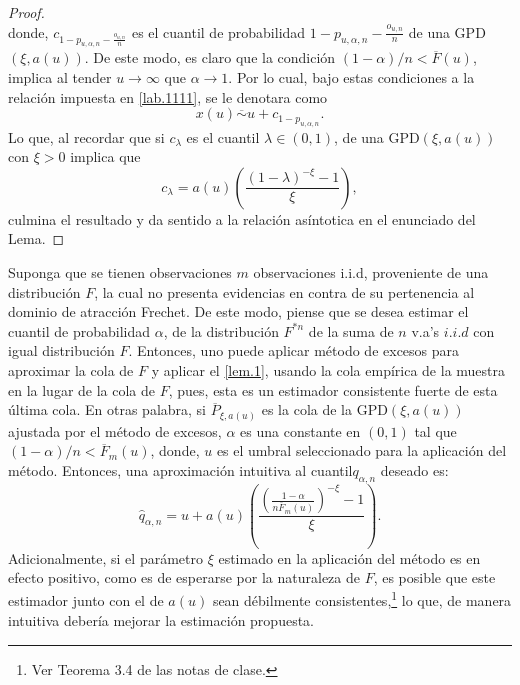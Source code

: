 \documentclass[10.5pt,notitlepage]{article}
\renewcommand{\qedsymbol}{$\blacksquare$}
\newcommand{\pare}[1]{\left( #1 \right)}
\theoremstyle{plain}
\newenvironment{rem}
  {\pushQED{\qed}\renewcommand{\qedsymbol}{$\triangle$}\remarkex}
  {\popQED\endremarkex}
\begin{document}
\begin{proof}
\begin{equation}
\end{equation}
donde, \(c_{1 - p_{u,\alpha,n} - \frac{o_{u,n}}{n}}\) es el cuantil de probabilidad \(1 - p_{u,\alpha,n} - \frac{o_{u,n}}{n}\) de una GPD\((\xi, a(u))\).  
De este modo, es claro que la condición \((1- \alpha)/n < \overline{F}(u)\), implica al tender \(u \to \infty\) que \(\alpha \to 1\). Por lo cual, bajo estas condiciones a la relación impuesta en \eqref{lab.1111}, se le denotara como 
\[
x(u) \overline{\sim} u + c_{1 - p_{u,\alpha,n}}.  
\]
Lo que, al recordar que si \(c_{\lambda}\) es el cuantil \(\lambda \in (0,1)\), de una GPD\((\xi,a(u))\) con \(\xi> 0\) implica que 
\[
c_{\lambda} = a(u)\pare{\frac{(1 - \lambda)^{-\xi} -1}{\xi}},
\]
culmina el resultado y da sentido a la relación asíntotica en el enunciado del Lema.  
\end{proof}
\begin{rem}[Aplicación práctica del \ref{lem.1}]\label{rem.1}
Suponga que se tienen observaciones \(m\) observaciones i.i.d, proveniente de una distribución \(F\), la cual no presenta evidencias en contra de su pertenencia al dominio de atracción Frechet. De este modo, piense que se desea estimar el cuantil de probabilidad \(\alpha\), de la distribución \(F^{*n}\) de la suma de \(n\) v.a's \(i.i.d\) con igual distribución \(F\). Entonces, uno puede aplicar método de excesos para aproximar la cola de \(F\) y aplicar el \eqref{lem.1}, usando la cola empírica de la muestra en la lugar de la cola de \(F\), pues, esta es un estimador consistente fuerte de esta última cola. En otras palabra, si \(\overline{P}_{\xi,a(u)}\) es la cola de la GPD\((\xi,a(u))\) ajustada por el método de excesos, \(\alpha\) es una constante en \((0,1)\) tal que \((1 - \alpha)/n < \overline{F}_{m}(u)\), donde, \(u\) es el umbral seleccionado para la aplicación del método. Entonces, una aproximación intuitiva al cuantil\(q_{\alpha,n}\) deseado es:
\[
\hat{q}_{\alpha,n} =  u  + a(u)\pare{\frac{\pare{\frac{1- \alpha}{n\overline{F}_{m}(u)}}^{-\xi} - 1}{\xi}}.
\]
Adicionalmente, si el parámetro \(\xi\) estimado en la aplicación del método es en efecto positivo, como es de esperarse por la naturaleza de \(F\), es posible que este estimador junto con el de \(a(u)\) sean débilmente consistentes,\footnote{Ver Teorema 3.4 de las notas de clase.} lo que, de manera intuitiva debería mejorar la estimación propuesta.
\end{rem}
\end{document}
